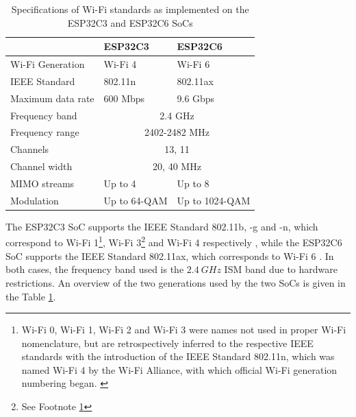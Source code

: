 \begin{table}[H]
    \centering
    \begin{tabular}{|l|l|l|}
        \hline
        & \textbf{ESP32C3} & \textbf{ESP32C6} \\\hline
        Wi-Fi Generation & Wi-Fi 4 & Wi-Fi 6 \\\hline
        IEEE Standard & 802.11n & 802.11ax \\\hline
        Maximum data rate & 600 Mbps & 9.6 Gbps \\\hline
        Frequency band & \multicolumn{2}{c|}{2.4 GHz} \\\hline
        Frequency range & \multicolumn{2}{c|}{2402-2482 MHz} \\\hline
        Channels & \multicolumn{2}{c|}{13, 11} \\\hline
        Channel width & \multicolumn{2}{c|}{20, 40 MHz} \\\hline
        MIMO streams & Up to 4 & Up to 8 \\\hline
        Modulation & Up to 64-QAM & Up to 1024-QAM \\\hline
    \end{tabular}
    \vspace{\ftspace}
    \caption{Specifications of Wi-Fi standards as implemented on the ESP32C3 and ESP32C6 SoCs \citep{noauthor_ieee_2009, noauthor_ieee_2021}}
    \label{tab:esp_wifi}
\end{table}

The ESP32C3 SoC supports the IEEE Standard 802.11b, -g and -n, which correspond to Wi-Fi 1\footnote{\label{note:wifi_name}Wi-Fi 0, Wi-Fi 1, Wi-Fi 2 and Wi-Fi 3 were names not used in proper Wi-Fi nomenclature, but are retrospectively inferred to the respective IEEE standards with the introduction of the IEEE Standard 802.11n, which was named Wi-Fi 4 by the Wi-Fi Alliance, with which official Wi-Fi generation numbering began. \citep{wi-fi_alliance_generational_2023}}, Wi-Fi 3\footnote{See Footnote \ref{note:wifi_name}} and Wi-Fi 4 respectively \citep{seeed_studio_seeed_2024-2, espressif_systems_esp32-c3_2024, wi-fi_alliance_generational_2023, noauthor_ieee_2000,noauthor_ieee_2003, noauthor_ieee_2009}, while the ESP32C6 SoC supports the IEEE Standard 802.11ax, which corresponds to Wi-Fi 6 \citep{seeed_studio_seeed_2024-1, espressif_systems_esp32-c6_2024, wi-fi_alliance_generational_2023, noauthor_ieee_2021}. In both cases, the frequency band used is the $2.4\ GHz$ ISM band due to hardware restrictions. An overview of the two generations used by the two SoCs is given in the Table \ref{tab:esp_wifi}.\\

